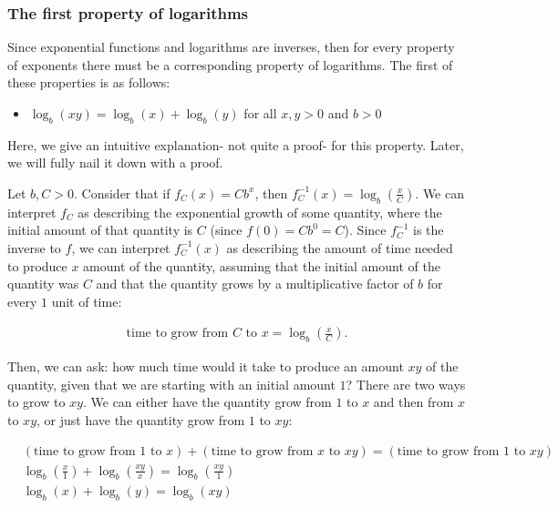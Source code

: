 \subsubsection*{The first property of logarithms}

Since exponential functions and logarithms are inverses, then for every property of exponents there must be a corresponding property of logarithms. The first of these properties is as follows:

\begin{itemize}
    \item $\log_b(xy) = \log_b(x) + \log_b(y)$ for all $x, y > 0$ and $b > 0$
\end{itemize}

Here, we give an intuitive explanation- not quite a proof- for this property. Later, we will fully nail it down with a proof.

Let $b, C > 0$. Consider that if $f_C(x) = C b^x$, then $f_C^{-1}(x) = \log_b(\frac{x}{C})$. We can interpret $f_C$ as describing the exponential growth of some quantity, where the initial amount of that quantity is $C$ (since $f(0) = Cb^0 = C$). Since $f_C^{-1}$ is the inverse to $f$, we can interpret $f_C^{-1}(x)$ as describing the amount of time needed to produce $x$ amount of the quantity, assuming that the initial amount of the quantity was $C$ and that the quantity grows by a multiplicative factor of $b$ for every $1$ unit of time:

\begin{align*}
    \text{time to grow from $C$ to $x$} = \log_b\left(\frac{x}{C}\right).
\end{align*}
                
Then, we can ask: how much time would it take to produce an amount $xy$ of the quantity, given that we are starting with an initial amount $1$? There are two ways to grow to $xy$. We can either have the quantity grow from $1$ to $x$ and then from $x$ to $xy$, or just have the quantity grow from $1$ to $xy$:

\begin{align*}
    &(\text{time to grow from $1$ to $x$}) + (\text{time to grow from $x$ to $xy$}) =     (\text{time to grow from $1$ to $xy$}) \\
    &\log_b\left(\frac{x}{1}\right) + \log_b\left(\frac{xy}{x}\right) = \log_b\left(\frac{xy}{1}\right) \\
    &\log_b(x) + \log_b(y) = \log_b(xy)
\end{align*}

